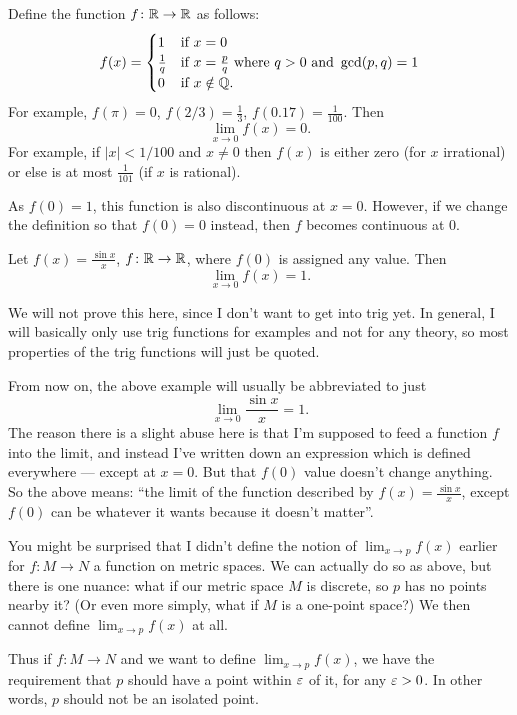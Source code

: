 \begin{example}
	\label{ex:rational_piecewise}
	Define the function $f \colon \mathbb R \to \mathbb R$ as follows:
	\[ f(x) = \begin{cases}
			1 & \text{if } x = 0 \\
			\frac1q & \text{if } x = \frac pq \text{ where } q > 0
				\text{ and } \gcd(p,q) = 1 \\
			0 & \text{if } x \notin \mathbb Q.
		\end{cases} \]
	For example, $f(\pi) = 0$, $f(2/3) = \frac13$, $f(0.17) = \frac{1}{100}$.
	Then \[ \lim_{x \to 0} f(x) = 0. \]
	For example, if $|x| < 1/100$ and $x \neq 0$
	then $f(x)$ is either zero (for $x$ irrational)
	or else is at most $\frac{1}{101}$ (if $x$ is rational).

	As $f(0) = 1$, this function is also discontinuous at $x = 0$.
	However, if we change the definition so that $f(0) = 0$ instead,
	then $f$ becomes continuous at $0$.
\end{example}

\begin{example}
	Let $f(x) = \frac{\sin x}{x}$, $f \colon \mathbb R \to \mathbb R$,
	where $f(0)$ is assigned any value.
	Then
	\[ \lim_{x \to 0} f(x) = 1. \]
\end{example}
We will not prove this here,
since I don't want to get into trig yet.
In general, I will basically only use trig functions
for examples and not for any theory,
so most properties of the trig functions will just be quoted.
\begin{abuse}
	\label{abuse:limit}
	From now on, the above example
	will usually be abbreviated to just
	\[ \lim_{x \to 0} \frac{\sin x}{x} = 1. \]
	The reason there is a slight abuse here
	is that I'm supposed to feed a function $f$ into the limit,
	and instead I've written down an expression
	which is defined everywhere --- except at $x=0$.
	But that $f(0)$ value doesn't change anything.
	So the above means: ``the limit of the function described
	by $f(x) = \frac{\sin x}{x}$,
	except $f(0)$ can be whatever it wants because it doesn't matter''.
\end{abuse}

\begin{remark}
	You might be surprised that I didn't define
	the notion of $\lim_{x \to p} f(x)$ earlier
	for $f \colon M \to N$ a function on metric spaces.
	We can actually do so as above, but there is one nuance:
	what if our metric space $M$ is discrete,
	so $p$ has no points nearby it?
	(Or even more simply, what if $M$ is a one-point space?)
	We then cannot define $\lim_{x \to p} f(x)$ at all.

	Thus if $f \colon M \to N$ and we want to define
	$\lim_{x \to p} f(x)$, we have the requirement that $p$
	should have a point within $\varepsilon$ of it, for any $\varepsilon > 0$.
	In other words, $p$ should not be an isolated point.
\end{remark}

